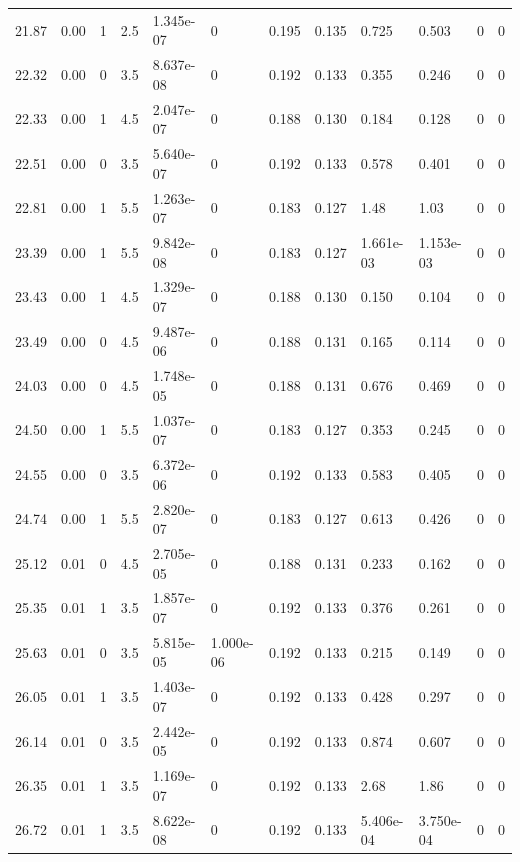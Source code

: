 \documentclass[preview]{standalone}
\begin{document}
{{{\begin{tabular}{L{1.2cm}C{1.2cm} C{0.3cm}C{0.5cm} C{1.4cm}C{1.4cm} C{1.4cm}C{1.4cm} C{1.6cm}C{1.6cm} C{1.6cm}C{1.6cm}}
  21.87  &  0.00  & 1     & 2.5 &  1.345e-07  & 0  &  0.195&   0.135& 0.725 & 0.503   &  0 & 0  \\ 
  22.32  &  0.00  & 0     & 3.5 &  8.637e-08  & 0  &  0.192&   0.133& 0.355 & 0.246   &  0 & 0  \\ 
  22.33  &  0.00  & 1     & 4.5 &  2.047e-07  & 0  &  0.188&   0.130& 0.184 & 0.128   &  0 & 0  \\ 
  22.51  &  0.00  & 0     & 3.5 &  5.640e-07  & 0  &  0.192&   0.133& 0.578 & 0.401   &  0 & 0  \\ 
  22.81  &  0.00  & 1     & 5.5 &  1.263e-07  & 0  &  0.183&   0.127& 1.48 & 1.03   &  0 & 0  \\ 
  23.39  &  0.00  & 1     & 5.5 &  9.842e-08  & 0  &  0.183&   0.127& 1.661e-03 & 1.153e-03   &  0 & 0  \\ 
  23.43  &  0.00  & 1     & 4.5 &  1.329e-07  & 0  &  0.188&   0.130& 0.150 & 0.104   &  0 & 0  \\ 
  23.49  &  0.00  & 0     & 4.5 &  9.487e-06  & 0  &  0.188&   0.131& 0.165 & 0.114   &  0 & 0  \\ 
  24.03  &  0.00  & 0     & 4.5 &  1.748e-05  & 0  &  0.188&   0.131& 0.676 & 0.469   &  0 & 0  \\ 
  24.50  &  0.00  & 1     & 5.5 &  1.037e-07  & 0  &  0.183&   0.127& 0.353 & 0.245   &  0 & 0  \\ 
  24.55  &  0.00  & 0     & 3.5 &  6.372e-06  & 0  &  0.192&   0.133& 0.583 & 0.405   &  0 & 0  \\ 
  24.74  &  0.00  & 1     & 5.5 &  2.820e-07  & 0  &  0.183&   0.127& 0.613 & 0.426   &  0 & 0  \\ 
  25.12  &  0.01  & 0     & 4.5 &  2.705e-05  & 0  &  0.188&   0.131& 0.233 & 0.162   &  0 & 0  \\ 
  25.35  &  0.01  & 1     & 3.5 &  1.857e-07  & 0  &  0.192&   0.133& 0.376 & 0.261   &  0 & 0  \\ 
  25.63  &  0.01  & 0     & 3.5 &  5.815e-05  & 1.000e-06  &  0.192&   0.133& 0.215 & 0.149   &  0 & 0  \\ 
  26.05  &  0.01  & 1     & 3.5 &  1.403e-07  & 0  &  0.192&   0.133& 0.428 & 0.297   &  0 & 0  \\ 
  26.14  &  0.01  & 0     & 3.5 &  2.442e-05  & 0  &  0.192&   0.133& 0.874 & 0.607   &  0 & 0  \\ 
  26.35  &  0.01  & 1     & 3.5 &  1.169e-07  & 0  &  0.192&   0.133& 2.68 & 1.86   &  0 & 0  \\ 
  26.72  &  0.01  & 1     & 3.5 &  8.622e-08  & 0  &  0.192&   0.133& 5.406e-04 & 3.750e-04   &  0 & 0  \\ 

\end{tabular}}}}
\end{document}
